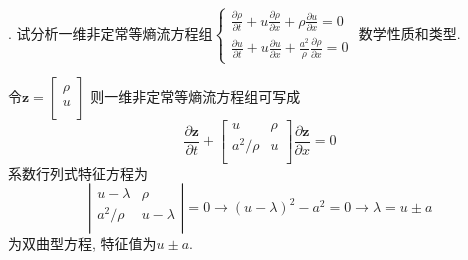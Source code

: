 
. 试分析一维非定常等熵流方程组$\displaystyle\begin{cases}
\displaystyle\frac{\partial\rho}{\partial t}+u\frac{\partial\rho}{\partial x}+\rho\frac{\partial u}{\partial x}=0\\
\displaystyle\frac{\partial u}{\partial t}+u\frac{\partial u}{\partial x}+\frac{a^{2}}{\rho}\frac{\partial\rho}{\partial x}=0
\end{cases}$ 数学性质和类型.

\noindent 令$\mathbf{z}=\left[
                \begin{array}{c}
                  \rho \\
                  u \\
                \end{array}
              \right]$
则一维非定常等熵流方程组可写成
\[
\frac{\partial \mathbf{z}}{\partial t}
+
\left[
                                          \begin{array}{cc}
                                            u & \rho \\
                                            a^2/\rho & u \\
                                          \end{array}
                                        \right]
\frac{\partial \mathbf{z}}{\partial x} = 0
\]
 系数行列式特征方程为
\[
 \left|
\begin{array}{cc}
u-\lambda & \rho \\
 a^2/\rho & u-\lambda \\
 \end{array}
\right| = 0 \rightarrow
(u-\lambda)^2 - a^2 = 0 \rightarrow \lambda=u\pm a
 \]
为双曲型方程, 特征值为$u\pm a$.
 \vspace{1em}

